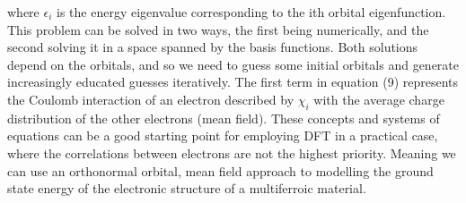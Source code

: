 \documentclass[10pt]{article}
\begin{document}
where $\epsilon_i$ is the energy eigenvalue corresponding to the ith orbital eigenfunction. This problem can be solved in two ways, the first being numerically, and the second solving it in a space spanned by the basis functions. Both solutions depend on the orbitals, and so we need to guess some initial orbitals and generate increasingly educated guesses iteratively. The first term in equation (9) represents the Coulomb interaction of an electron described by $\chi_i$ with the average charge distribution of the other electrons (mean field). These concepts and systems of equations can be a good starting point for employing DFT in a practical case, where the correlations between electrons are not the highest priority. Meaning we can use an orthonormal orbital, mean field approach to modelling the ground state energy of the electronic structure of a multiferroic material.





\end{document}
